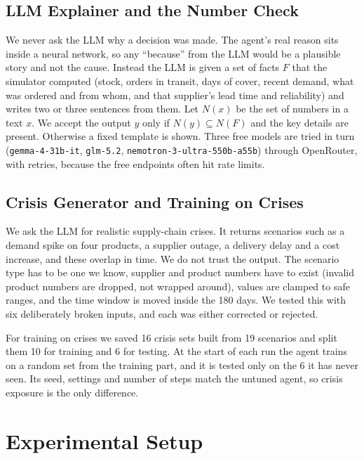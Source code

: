 \documentclass[10pt,twocolumn]{article}
\begin{document}
\subsection{LLM Explainer and the Number Check}

We never ask the LLM why a decision was made. The agent's real reason sits
inside a neural network, so any ``because'' from the LLM would be a plausible
story and not the cause. Instead the LLM is given a set of facts $F$ that the
simulator computed (stock, orders in transit, days of cover, recent demand,
what was ordered and from whom, and that supplier's lead time and reliability)
and writes two or three sentences from them. Let $N(x)$ be the set of numbers
in a text $x$. We accept the output $y$ only if $N(y)\subseteq N(F)$ and the key
details are present. Otherwise a fixed template is shown. Three free models are
tried in turn (\texttt{gemma-4-31b-it}, \texttt{glm-5.2},
\texttt{nemotron-3-ultra-550b-a55b}) through OpenRouter, with retries, because
the free endpoints often hit rate limits.

\subsection{Crisis Generator and Training on Crises}

We ask the LLM for realistic supply-chain crises. It returns scenarios such as a
demand spike on four products, a supplier outage, a delivery delay and a cost
increase, and these overlap in time. We do not trust the output. The scenario
type has to be one we know, supplier and product numbers have to exist (invalid
product numbers are dropped, not wrapped around), values are clamped to safe
ranges, and the time window is moved inside the 180 days. We tested this with
six deliberately broken inputs, and each was either corrected or rejected.

For training on crises we saved 16 crisis sets built from 19 scenarios and
split them 10 for training and 6 for testing. At the start of each run the agent
trains on a random set from the training part, and it is tested only on the 6
it has never seen. Its seed, settings and number of steps match the untuned
agent, so crisis exposure is the only difference.

\section{Experimental Setup}
\end{document}
